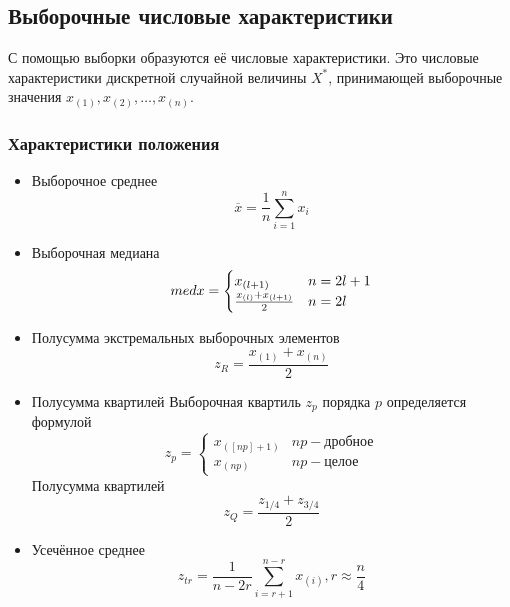 \documentclass[a4paper]{article}
\begin{document}
	\subsection{Выборочные числовые характеристики}
	\noindent С помощью выборки образуются её числовые характеристики. Это числовые характеристики дискретной случайной величины $X^{*}$, принимающей выборочные значения $x_{(1)}, x_{(2)}, \ldots, x_{(n)}$.
	
	\subsubsection{Характеристики положения}
	\begin{itemize}
		\item Выборочное среднее \begin{equation}
									 \overline{x} = \frac{1}{n}\sum_{i=1}^{n}{x_i}
								\end{equation}
		\item Выборочная медиана \begin{equation}
								 	med x = \begin{cases}
											 	x_{(l+1)} &\text{$ n=2l+1$}\\
											 	\frac{x_{(l)} + x_{(l+1)}}{2} &\text{$ n=2l$}
								 			\end{cases}
								 \end{equation}
		\item Полусумма экстремальных выборочных элементов \begin{equation}
														       z_R = \frac{x_{(1)} + x_{(n)}}{2}
														   \end{equation}
		\item Полусумма квартилей \newline Выборочная квартиль $z_p$ порядка $p$ определяется формулой \begin{equation}
				 	z_p = \begin{cases}
		             	  	x_{([np]+1)} &\text{$np - $дробное}\\
		      			    x_{(np)}&\text{$np - $целое}
		      			  \end{cases}
				 \end{equation}
				 Полусумма квартилей \begin{equation}
				 					 	z_Q = \frac{z_{1/4} + z_{3/4}}{2}
				 					 \end{equation}
		\item Усечённое среднее\begin{equation}
							   		z_{tr} = \frac{1}{n-2r}\sum_{i=r+1}^{n-r}{x_{(i)}}, r\approx\frac{n}{4}	   	\end{equation}
	\end{itemize}
\end{document}
